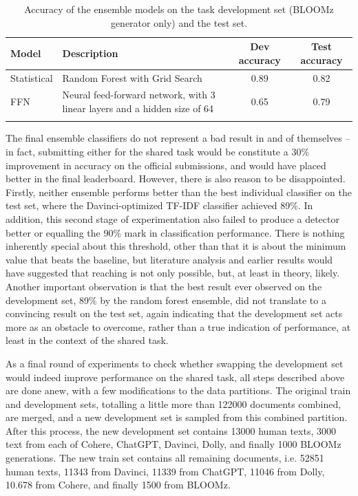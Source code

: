 \begin{table}[h]
    \vspace{0.1cm}
    \centering
    \begin{tabular}{lp{150px}cc}
        \hline
        Model       & Description                                                               & Dev accuracy & Test accuracy \\
        \hline
        Statistical & Random Forest with Grid Search                                            & 0.89         & 0.82          \\
        FFN         & Neural feed-forward network, with 3 linear layers and a hidden size of 64 & 0.65         & 0.79          \\
        \hline
        \vspace{0.1cm}
    \end{tabular}
    \caption{Accuracy of the ensemble models on the task development set (BLOOMz generator only) and the test set.}
    \label{tab:ensemble-initial}
\end{table}

The final ensemble classifiers do not represent a bad result in and of themselves -- in fact, submitting either for the shared task would be constitute a 30\% improvement in accuracy on the official submissions, and would have placed better in the final leaderboard.
However, there is also reason to be disappointed.
Firstly, neither ensemble performs better than the best individual classifier on the test set, where the Davinci-optimized TF-IDF classifier achieved 89\%.
In addition, this second stage of experimentation also failed to produce a detector better or equalling the 90\% mark in classification performance.
There is nothing inherently special about this threshold, other than that it is about the minimum value that beats the baseline, but literature analysis and earlier results would have suggested that reaching is not only possible, but, at least in theory, likely.
Another important observation is that the best result ever observed on the development set, 89\% by the random forest ensemble, did not translate to a convincing result on the test set, again indicating that the development set acts more as an obstacle to overcome, rather than a true indication of performance, at least in the context of the shared task.

As a final round of experiments to check whether swapping the development set would indeed improve performance on the shared task, all steps described above are done anew, with a few modifications to the data partitions.
The original train and development sets, totalling a little more than 122000 documents combined, are merged, and a new development set is sampled from this combined partition.
After this process, the new development set contains 13000 human texts, 3000 text from each of Cohere, ChatGPT, Davinci, Dolly, and finally 1000 BLOOMz generations.
The new train set contains all remaining documents, i.e. 52851 human texts, 11343 from Davinci, 11339 from ChatGPT, 11046 from Dolly, 10.678 from Cohere, and finally 1500 from BLOOMz.

